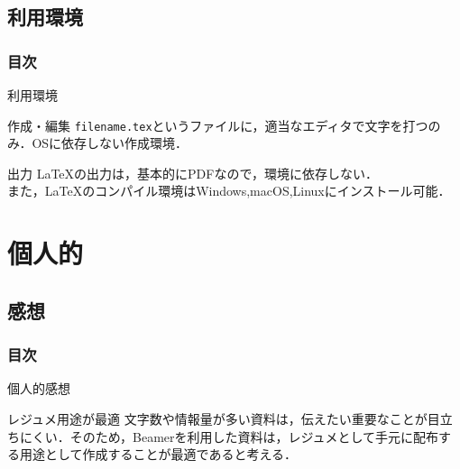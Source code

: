 \documentclass[dvipdfmx]{beamer}
\begin{document}
\subsection{利用環境}
\begin{frame}
\frametitle{目次}
\tableofcontents[currentsection,sectionstyle=show/shaded,subsectionstyle=show/shaded]
\end{frame}

\begin{frame}[fragile]{利用環境}
    \begin{block}{作成・編集}
        \verb|filename.tex|というファイルに，適当なエディタで文字を打つのみ．OSに依存しない作成環境．
    \end{block}
    \begin{block}{出力}
        \LaTeX の出力は，基本的にPDFなので，環境に依存しない．\\
        また，\LaTeX のコンパイル環境はWindows,macOS,Linuxにインストール可能．
    \end{block}
\end{frame}

\section{個人的}
\subsection{感想}
\begin{frame}
\frametitle{目次}
\tableofcontents[currentsection,sectionstyle=show/shaded,subsectionstyle=show/shaded]
\end{frame}

\begin{frame}{個人的感想}
    \begin{block}{レジュメ用途が最適}
        文字数や情報量が多い資料は，伝えたい重要なことが目立ちにくい．そのため，Beamerを利用した資料は，レジュメとして手元に配布する用途として作成することが最適であると考える．\\
    \end{block}
\end{frame}
\end{document}
